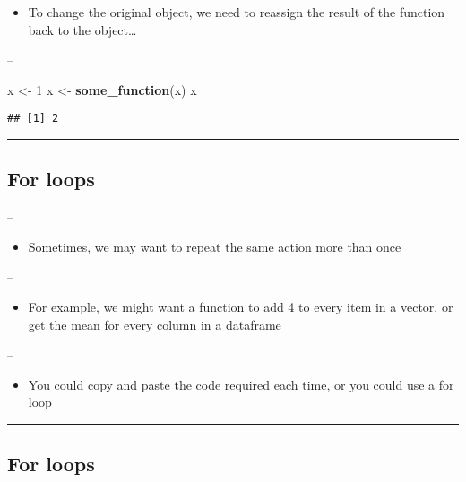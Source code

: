 \documentclass[]{article}
\newenvironment{Shaded}{\begin{snugshade}}{\end{snugshade}}
\newcommand{\DecValTok}[1]{\textcolor[rgb]{0.00,0.00,0.81}{#1}}
\newcommand{\KeywordTok}[1]{\textcolor[rgb]{0.13,0.29,0.53}{\textbf{#1}}}
\newcommand{\NormalTok}[1]{#1}
\newcommand{\StringTok}[1]{\textcolor[rgb]{0.31,0.60,0.02}{#1}}
\providecommand{\tightlist}{%
  \setlength{\itemsep}{0pt}\setlength{\parskip}{0pt}}
\begin{document}
\begin{itemize}
\tightlist
\item
  To change the original object, we need to reassign the result of the
  function back to the object\ldots{}
\end{itemize}

--

\begin{Shaded}
\begin{Highlighting}[]
\NormalTok{x <-}\StringTok{ }\DecValTok{1}
\NormalTok{x <-}\StringTok{ }\KeywordTok{some_function}\NormalTok{(x)}
\NormalTok{x}
\end{Highlighting}
\end{Shaded}

\begin{verbatim}
## [1] 2
\end{verbatim}

\begin{center}\rule{0.5\linewidth}{\linethickness}\end{center}

\hypertarget{for-loops}{%
\subsection{For loops}\label{for-loops}}

--

\begin{itemize}
\tightlist
\item
  Sometimes, we may want to repeat the same action more than once
\end{itemize}

--

\begin{itemize}
\tightlist
\item
  For example, we might want a function to add 4 to every item in a
  vector, or get the mean for every column in a dataframe
\end{itemize}

--

\begin{itemize}
\tightlist
\item
  You could copy and paste the code required each time, or you could use
  a for loop
\end{itemize}

\begin{center}\rule{0.5\linewidth}{\linethickness}\end{center}

\hypertarget{for-loops-1}{%
\subsection{For loops}\label{for-loops-1}}
\end{document}
